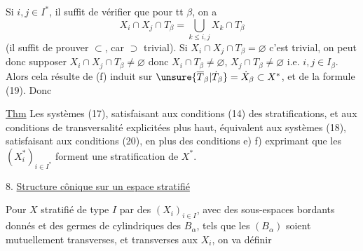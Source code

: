 Si $i,j\in I^*$, il suffit 
de vérifier que pour tt
$\beta$, on a
\[
X_i\cap X_j\cap T_\beta=\bigcup_{k\le i,j}X_k\cap T_\beta
\]
(il suffit de prouver $\subset$, car $\supset$ trivial). Si
$X_i\cap X_j\cap T_\beta=\varnothing$ c'est trivial, on peut donc supposer
$X_i\cap X_j\cap T_\beta\ne\varnothing$
donc $X_i\cap T_\beta\ne\varnothing$, $X_j\cap T_\beta\ne\varnothing$
i.e. $i,j\in I_\beta$. Alors  cela résulte de
(f) induit sur $\unsure{\overline T_\beta|\dot T_\beta}=\dot X_\beta\subset X^*$,
et de la formule (19). Donc

\uline{Thm} Les systèmes (17), satisfaisant aux
conditions  (14) des stratifications, et aux
conditions de transversalité explicitées plus
haut, équivalent aux systèmes (18), satisfaisant
aux conditions (20), en plus des conditions
e) f) exprimant que les $(X_i^*)_{i\in I^*}$ forment une
stratification de $X^*$.

8. \uline{Structure cônique sur un espace stratifié}

Pour $X$ stratifié de type $I$ par des
$(X_i)_{i\in I}$, avec des sous-espaces bordants donnés
et des germes de  cylindriques des $B_\alpha$, tels que
les $(B_\alpha)$ soient mutuellement transverses, et
transverses aux $X_i$, on va  définir
